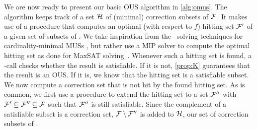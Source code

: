 We are now ready to present our basic OUS algorithm in \cref{alg:omus}. 
The algorithm keeps track of a set $\mathcal{H}$ of (minimal) correction subsets of $\mathcal{F} $. 
It makes use of a procedure \ohs that computes an optimal (with respect to $f$) hitting set $\mathcal{F} '$  of a given set of subsets of \formula. 
We take inspiration from the \hitsetbased~solving techniques for cardinality-minimal MUSs \cite{ignatiev2015smallest}, but rather use a MIP solver to compute the optimal hitting set as done for MaxSAT solving~\cite{DBLP:conf/sat/DaviesB13}.
Whenever such a hitting set is found, a \sat-call checks whether the result is satisfiable. If it is not, \cref{prop:K} guarantees that the result is an OUS. 
If it is, we know that the hitting set is a satisfiable subset. We now compute a correction set that is not hit by the found hitting set.
As is common, we first use a procedure \grow to extend the hitting set to a set $\mathcal{F} ''$ with $\mathcal{F} '\subseteq \mathcal{F} ''\subseteq\mathcal{F} $ such that $\mathcal{F} ''$ is still satisfiable. Since the complement of a satisfiable subset is a correction set, $\mathcal{F}  \setminus \mathcal{F} ''$ is added to $\mathcal{H}$, our set of correction subsets of \formula.

% 


% 

